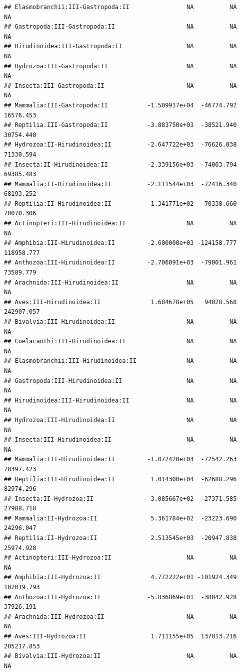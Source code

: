 \documentclass[
  12pt,
]{article}
\begin{document}
\begin{verbatim}
## Elasmobranchii:III-Gastropoda:II                NA          NA          NA
## Gastropoda:III-Gastropoda:II                    NA          NA          NA
## Hirudinoidea:III-Gastropoda:II                  NA          NA          NA
## Hydrozoa:III-Gastropoda:II                      NA          NA          NA
## Insecta:III-Gastropoda:II                       NA          NA          NA
## Mammalia:III-Gastropoda:II           -1.509917e+04  -46774.792   16576.453
## Reptilia:III-Gastropoda:II           -3.883750e+03  -38521.940   30754.440
## Hydrozoa:II-Hirudinoidea:II          -2.647722e+03  -76626.038   71330.594
## Insecta:II-Hirudinoidea:II           -2.339156e+03  -74063.794   69385.483
## Mammalia:II-Hirudinoidea:II          -2.111544e+03  -72416.340   68193.252
## Reptilia:II-Hirudinoidea:II          -1.341771e+02  -70338.660   70070.306
## Actinopteri:III-Hirudinoidea:II                 NA          NA          NA
## Amphibia:III-Hirudinoidea:II         -2.600000e+03 -124158.777  118958.777
## Anthozoa:III-Hirudinoidea:II         -2.706091e+03  -79001.961   73589.779
## Arachnida:III-Hirudinoidea:II                   NA          NA          NA
## Aves:III-Hirudinoidea:II              1.684678e+05   94028.568  242907.057
## Bivalvia:III-Hirudinoidea:II                    NA          NA          NA
## Coelacanthi:III-Hirudinoidea:II                 NA          NA          NA
## Elasmobranchii:III-Hirudinoidea:II              NA          NA          NA
## Gastropoda:III-Hirudinoidea:II                  NA          NA          NA
## Hirudinoidea:III-Hirudinoidea:II                NA          NA          NA
## Hydrozoa:III-Hirudinoidea:II                    NA          NA          NA
## Insecta:III-Hirudinoidea:II                     NA          NA          NA
## Mammalia:III-Hirudinoidea:II         -1.072420e+03  -72542.263   70397.423
## Reptilia:III-Hirudinoidea:II          1.014300e+04  -62688.296   82974.296
## Insecta:II-Hydrozoa:II                3.085667e+02  -27371.585   27988.718
## Mammalia:II-Hydrozoa:II               5.361784e+02  -23223.690   24296.047
## Reptilia:II-Hydrozoa:II               2.513545e+03  -20947.838   25974.928
## Actinopteri:III-Hydrozoa:II                     NA          NA          NA
## Amphibia:III-Hydrozoa:II              4.772222e+01 -101924.349  102019.793
## Anthozoa:III-Hydrozoa:II             -5.836869e+01  -38042.928   37926.191
## Arachnida:III-Hydrozoa:II                       NA          NA          NA
## Aves:III-Hydrozoa:II                  1.711155e+05  137013.216  205217.853
## Bivalvia:III-Hydrozoa:II                        NA          NA          NA

\end{verbatim}
\end{document}
